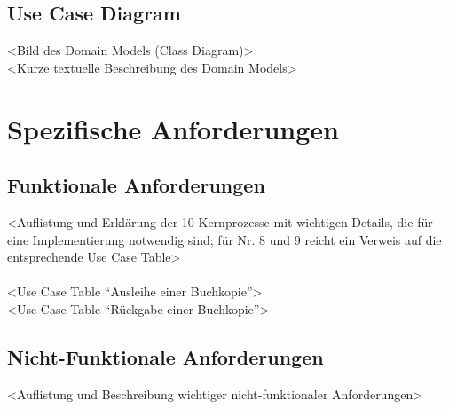 \documentclass{article}
\begin{document}
\subsection{Use Case Diagram}
\textless Bild des Domain Models (Class Diagram)\textgreater\\
\textless Kurze textuelle Beschreibung des Domain Models\textgreater



\section{Spezifische Anforderungen}

\subsection{Funktionale Anforderungen}
\textless Auflistung und Erklärung der 10 Kernprozesse mit wichtigen Details, die für eine Implementierung notwendig sind; für Nr. 8 und 9 reicht ein Verweis auf die entsprechende Use Case Table\textgreater\\\\
\textless Use Case Table \enquote{Ausleihe einer Buchkopie}\textgreater\\
\textless Use Case Table \enquote{Rückgabe einer Buchkopie}\textgreater


\subsection{Nicht-Funktionale Anforderungen}
\textless Auflistung und Beschreibung wichtiger nicht-funktionaler Anforderungen\textgreater 
\end{document}
